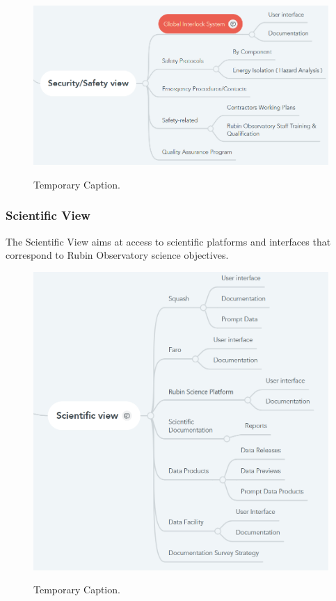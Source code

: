 \begin{figure}[ht]
\caption{Temporary Caption.}
\centering
\includegraphics[width=\textwidth]{access-veiw-safety-example-temp}
\label{fig:access-veiw-safety-example-temp}
\end{figure}

\subsubsection{Scientific View}

The Scientific View aims at access to scientific platforms and interfaces that correspond to Rubin Observatory science objectives.

\begin{figure}[ht]
\caption{Temporary Caption.}
\centering
\includegraphics[width=\textwidth]{access-veiw-scientific-example-temp}
\label{fig:access-veiw-scientific-example-temp}
\end{figure}

